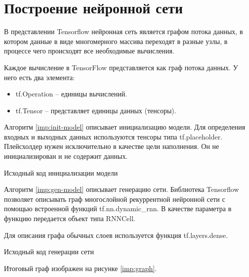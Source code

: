 \section{Построение нейронной сети}

В представлении Tensorflow нейронная сеть является графом потока данных, в котором данные в виде многомерного массива переходят в разные узлы, в процессе чего происходят все необходимые вычисления.

Каждое вычисление в TensorFlow представляется как граф потока данных. У него есть два элемента:

\begin{itemize}
	\item tf.Operation -- единицы вычислений.
	\item tf.Tensor -- представляет единицы данных (тенсоры).
\end{itemize}

Алгоритм \ref{imp:init-model} описывает инициализацию модели. Для определения входных и выходных данных используются тенсоры типа tf.placeholder. Плейсхолдер нужен исключительно в качестве цели наполнения. Он не инициализирован и не содержит данных.

\begin{minipage}{0.75\textwidth}
\begin{algorithm}[H]

\caption{Исходный код инициализации модели}
\label{imp:init-model}
\end{algorithm}
\end{minipage}

Алгоритм \ref{imp:gen-model} описывает генерацию сети. Библиотека Tensorflow позволяет описывать граф многослойной рекуррентной нейронной сети с помощью встроенной функций tf.nn.dynamic\_rnn. В качестве параметра в функцию передается объект типа RNNCell.

Для описания графа обычных слоев используется функция tf.layers.dense.

\begin{minipage}{0.75\textwidth}
\begin{algorithm}[H]
	
	\caption{Исходный код генерации сети}
	\label{imp:gen-model}
\end{algorithm}
\end{minipage}

Итоговый граф изображен на рисунке \ref{imp:graph}.


